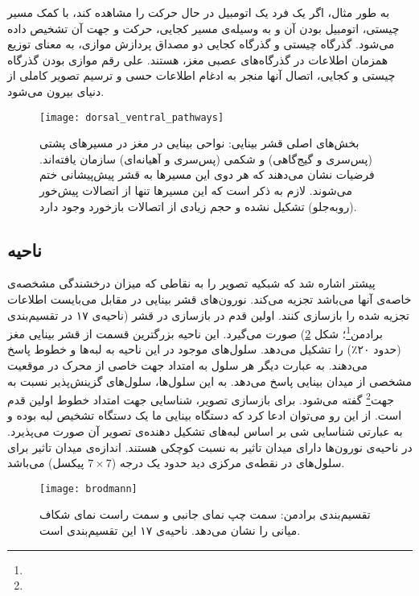 به طور مثال، اگر یک فرد یک اتومبیل در حال حرکت را مشاهده کند، با کمک مسیر چیستی، اتومبیل بودن آن و به وسیله‌ی مسیر کجایی، حرکت و جهت آن تشخیص داده می‌شود. 
گذرگاه چیستی و گذرگاه کجایی دو مصداق پردازش موازی، به معنای توزیع همزمان اطلاعات در گذرگاه‌های عصبی مغز، هستند. علی رقم موازی بودن گذرگاه چیستی و کجایی، اتصال آنها منجر به ادغام اطلاعات حسی و ترسیم تصویر کاملی از دنیای بیرون می‌شود. 

\begin{figure}
\centering
{\footnotesize
\texttt{[image: dorsal\_ventral\_pathways]}
\caption[بخش‌های اصلی قشر بینایی]{بخش‌های اصلی قشر بینایی: نواحی بینایی در مغز در مسیر‌های پشتی (پس‌سری و گیج‌گاهی) و شکمی (پس‌سری و آهیانه‌ای) سازمان یافته‌اند. فرضیات نشان می‌دهند که هر دوی این مسیرها به قشر پیش‌پیشانی ختم می‌شوند. لازم به ذکر است که این مسیرها تنها از اتصالات پیش‌خور (رو‌به‌جلو) تشکیل نشده و حجم زیادی از اتصالات بازخورد وجود دارد.}
\label{fig:dorsal_ventral_pathways}
}
\end{figure}
\subsection{ناحیه }
پیشتر اشاره شد که شبکیه تصویر را به نقاطی که میزان درخشندگی مشخصه‌ی خاصه‌ی آنها می‌باشد تجزیه می‌کند. نورون‌های قشر بینایی در مقابل می‌بایست اطلاعات تجزیه شده را بازسازی کنند. اولین قدم در بازسازی در قشر  (ناحیه‌ی ۱۷ در تقسیم‌بندی برادمن\footnote{}؛ شکل \ref{fig:brodmann}) صورت می‌گیرد. این ناحیه بزرگترین قسمت از قشر بینایی مغز (حدود ۲۰٪) را تشکیل می‌دهد. سلول‌های موجود در این ناحیه به لبه‌ها و خطوط پاسخ می‌دهند. به عبارت دیگر هر سلول به امتداد جهت خاصی از محرک در موقعیت مشخصی از میدان بینایی پاسخ می‌دهد. به این سلول‌ها، سلول‌های گزینش‌پذیر نسبت به جهت\footnote{} گفته می‌شود. برای بازسازی تصویر، شناسایی جهت امتداد خطوط اولین قدم است. از این رو می‌توان ادعا کرد که دستگاه بینایی ما یک دستگاه تشخیص لبه بوده و به عبارتی شناسایی شی بر اساس لبه‌های تشکیل دهنده‌ی تصویر آن صورت می‌پذیرد. در ناحیه‌ی  نورون‌ها دارای میدان تاثیر به نسبت کوچکی هستند. اندازه‌ی میدان تاثیر برای سلول‌های  در نقطه‌ی مرکزی دید حدود یک درجه ($7\times 7$ پیکسل) می‌باشد. 

\begin{figure}
\centering
{\footnotesize
\texttt{[image: brodmann]}
\caption[تقسیم‌بندی Brodmann]{تقسیم‌بندی برادمن: سمت چپ نمای جانبی و سمت راست نمای شکاف میانی را نشان می‌دهد.  ناحیه‌ی ۱۷ این تقسیم‌بندی است.}
\label{fig:brodmann}
}
\end{figure}

